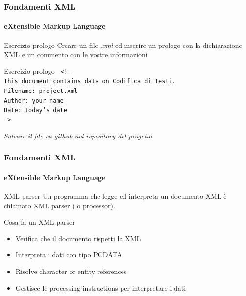 \begin{frame}
	\frametitle{Fondamenti XML}
	\framesubtitle{eXtensible Markup Language}
	\addtocounter{nframe}{1}

	\begin{block}{Esercizio prologo}
		Creare un file \textit{.xml} ed inserire un prologo con la dichiarazione XML e un commento con le vostre informazioni.
	\end{block}

	\begin{block}{Esercizio prologo}
		\texttt{
		 <!--
		 	\\This document contains data on Codifica di Testi.
		 	\\Filename: project.xml
		 	\\Author: your name
		 	\\Date: today's date
		\\-->
		}
	\end{block}

	\begin{tiny}
		\textit{Salvare il file su github nel repository del progetto}
	\end{tiny}

\end{frame}

\begin{frame}
	\frametitle{Fondamenti XML}
	\framesubtitle{eXtensible Markup Language}
	\addtocounter{nframe}{1}

	\begin{block}{XML parser}
		Un programma che legge ed interpreta un documento XML è chiamato XML parser ( o processor).
	\end{block}
	\begin{block}{Cosa fa un XML parser}
		\begin{itemize}
			\item Verifica che il documento rispetti la  XML
			\item Interpreta i dati con tipo PCDATA 
			\item Risolve character or entity references
			\item Gestisce le processing instructions per interpretare i dati
		\end{itemize}
	\end{block}

\end{frame}

